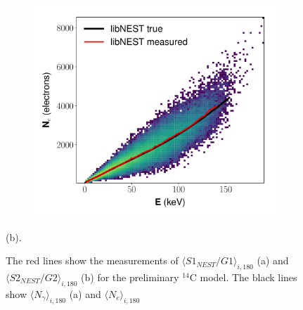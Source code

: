\begin{figure}[h!]
\begin{subfigure}{0.5\textwidth}
  \includegraphics[width=\textwidth]{Figures/yields_corrections/C14_QN_heatmap_gfdcm_180Vcm_prelim.pdf}
  \caption{}
\end{subfigure}
\caption{The red lines show the measurements of  $\langle S1_{NEST}/G1 \rangle_{i,180}$ (a) and $\langle S2_{NEST}/G2 \rangle_{i,180}$ (b) for the preliminary $^{14}$C model. The black lines show $\langle N_{\gamma} \rangle_{i,180}$ (a) and $\langle N_{e} \rangle_{i,180}$} (b).
\label{fig:lnqn_180_prelim}
\end{figure} 

